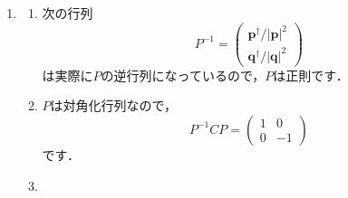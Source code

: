 \documentclass[a4paper,pdflatex,ja=standard]{bxjsarticle}
\begin{document}
\begin{enumerate}
\begin{enumerate}
  \end{enumerate}
  

  \item 

  \begin{enumerate}

    \item 

    次の行列
    \begin{equation}
      P^{-1}
      =
      \begin{pmatrix}
        \bm{p}^{\dag}/|\bm{p}|^2 \\
        \bm{q}^{\dag}/|\bm{q}|^2 
      \end{pmatrix}
    \end{equation}
    は実際に$P$の逆行列になっているので，$P$は正則です．


    \item 

    $P$は対角化行列なので，
    \begin{equation}
      P^{-1}CP
      =
      \begin{pmatrix}
        1 & 0 \\
        0 & -1
      \end{pmatrix}
    \end{equation}
    です．


    \item 


\end{enumerate}
\end{enumerate}
\end{document}
